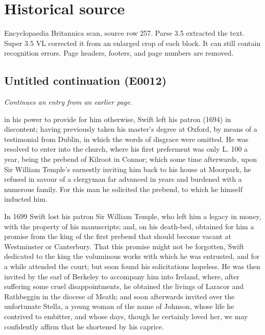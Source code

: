 \documentclass{article}
\begin{document}
\section*{Historical source}
Encyclopaedia Britannica scan, source row 257. Parse 3.5 extracted the text. Super 3.5 VL corrected it from an enlarged crop of each block. It can still contain recognition errors.
Page headers, footers, and page numbers are removed.

\subsection*{Untitled continuation (E0012)}
\textit{Continues an entry from an earlier page.}

in his power to provide for him otherwise, Swift left his patron (1694) in discontent; having previously taken his master's degree at Oxford, by means of a testimonial from Dublin, in which the words of disgrace were omitted. He was resolved to enter into the church, where his first preferment was only L. 100 a year, being the prebend of Kilroot in Connor; which some time afterwards, upon Sir William Temple's earnestly inviting him back to his house at Moorpark, he refused in savour of a clergyman far advanced in years and burdened with a numerous family. For this man he solicited the prebend, to which he himself inducted him.

In 1699 Swift lost his patron Sir William Temple, who left him a legacy in money, with the property of his manuscripts; and, on his death-bed, obtained for him a promise from the king of the first prebend that should become vacant at Westminster or Canterbury. That this promise might not be forgotten, Swift dedicated to the king the voluminous works with which he was entrusted, and for a while attended the court; but soon found his solicitations hopeless. He was then invited by the earl of Berkeley to accompany him into Ireland, where, after suffering some cruel disappointments, he obtained the livings of Laracor and Rathbeggin in the diocese of Meath; and soon afterwards invited over the unfortunate Stella, a young woman of the name of Johnson, whose life he contrived to embitter, and whose days, though he certainly loved her, we may confidently affirm that he shortened by his caprice.
\end{document}
